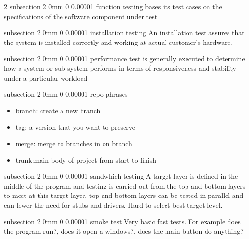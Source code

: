 \documentclass[a4paper,11pt]{article}
\makeatletter
\renewcommand{\subsection}{\@startsection
   {subsection}%
   {2}%
   {0mm}%
   {0\baselineskip}%
   {0.00001\baselineskip}%
   {\rmfamily\normalfont\slshape\normalsize}}%
\makeatother
\begin{document}
\begin{multicols}{2}
 \subsection{function testing}
bases its test cases on the specifications of the software component under test
 
  \subsection{installation testing}
 An installation test assures that the system is installed correctly and working at actual customer's hardware.
 
 \subsection{performance test}
is generally executed to determine how a system or sub-system performs in terms of responsiveness and stability under a particular workload 
 
\subsection{repo phrases}
\vspace{0 mm}
\begin{itemize}
 \setlength\itemsep{0em}
\item branch: create a new branch 
\item tag: a version that you want to preserve
\item merge: merge to branches in on branch
\item trunk:main body of project from start to finish
\end{itemize}

\subsection{sandwhich testing}
A target layer is defined in the middle of the program and testing is carried out from the top and bottom layers to meet at this target layer. top and bottom layers can be tested in parallel and
can lower the need for stubs and drivers. Hard to select best target level.

\subsection{smoke test}
Very basic fast tests. For example does the program run?, does it open a windows?, does the main button do anything?


\end{multicols}
\end{document}
